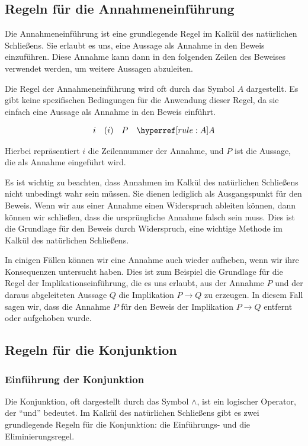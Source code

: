 \documentclass[main.tex]{subfiles}
\begin{document}
\subsection{Regeln für die Annahmeneinführung}
\label{rule:A}
Die Annahmeneinführung ist eine grundlegende Regel im Kalkül des natürlichen Schließens. Sie erlaubt es uns, eine Aussage als Annahme in den Beweis einzuführen. Diese Annahme kann dann in den folgenden Zeilen des Beweises verwendet werden, um weitere Aussagen abzuleiten.

Die Regel der Annahmeneinführung wird oft durch das Symbol \(A\) dargestellt. Es gibt keine spezifischen Bedingungen für die Anwendung dieser Regel, da sie einfach eine Aussage als Annahme in den Beweis einführt.

\[
\begin{array}{llll}	
i & (i) & P & \rA \\
\end{array}
\]

Hierbei repräsentiert \(i\) die Zeilennummer der Annahme, und \(P\) ist die Aussage, die als Annahme eingeführt wird.

Es ist wichtig zu beachten, dass Annahmen im Kalkül des natürlichen Schließens nicht unbedingt wahr sein müssen. Sie dienen lediglich als Ausgangspunkt für den Beweis. Wenn wir aus einer Annahme einen Widerspruch ableiten können, dann können wir schließen, dass die ursprüngliche Annahme falsch sein muss. Dies ist die Grundlage für den Beweis durch Widerspruch, eine wichtige Methode im Kalkül des natürlichen Schließens.

In einigen Fällen können wir eine Annahme auch wieder aufheben, wenn wir ihre Konsequenzen untersucht haben. Dies ist zum Beispiel die Grundlage für die Regel der Implikationseinführung, die es uns erlaubt, aus der Annahme \(P\) und der daraus abgeleiteten Aussage \(Q\) die Implikation \(P \rightarrow Q\) zu erzeugen. In diesem Fall sagen wir, dass die Annahme \(P\) für den Beweis der Implikation \(P \rightarrow Q\) entfernt oder aufgehoben wurde.


\subsection{Regeln für die Konjunktion}

\subsubsection{Einführung der Konjunktion}
\label{rule:AI}
Die Konjunktion, oft dargestellt durch das Symbol \(\land\), ist ein logischer Operator, der \enquote{und} bedeutet. Im Kalkül des natürlichen Schließens gibt es zwei grundlegende Regeln für die Konjunktion: die Einführungs- und die Eliminierungsregel.
\end{document}
